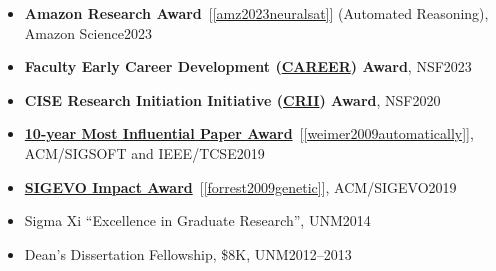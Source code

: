 \documentclass[11pt]{article}
\begin{document}
\begin{itemize}
  \item \textbf{Amazon Research Award}~[\ref{amz2023neuralsat}] (Automated Reasoning), Amazon Science\hfill 2023
\item \textbf{Faculty Early Career Development (\href{https://www.nsf.gov/awardsearch/showAward?AWD_ID=2238133}{CAREER}) Award}, NSF\hfill 2023

\item \textbf{CISE Research Initiation Initiative (\href{https://www.nsf.gov/awardsearch/showAward?AWD_ID=1948536}{CRII}) Award}, NSF\hfill 2020

\item \href{https://www.sigsoft.org/awards/icseMIPAward.html}{\textbf{10-year Most Influential Paper Award}}~[\ref{weimer2009automatically}], ACM/SIGSOFT and IEEE/TCSE\hfill 2019

  
\item \href{https://sig.sigevo.org/index.html/tiki-index.php?page=SIGEVO+Impact+Award}{\textbf{SIGEVO Impact Award}}~[\ref{forrest2009genetic}], ACM/SIGEVO\hfill 2019

\item  Sigma Xi ``Excellence in Graduate Research'', UNM\hfill 2014
\item Dean's Dissertation Fellowship, \$8K, UNM\hfill 2012--2013


\end{itemize}
\end{document}
